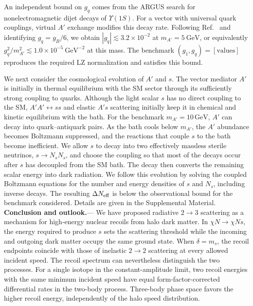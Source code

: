 \documentclass[prd,showpacs,preprintnumbers,amsmath,amssymb,twocolumn,
superscriptaddress,notitlepage]{revtex4-2}
\begin{document}
An independent bound on $g_q$ comes from the ARGUS search
for nonelectromagnetic dijet decays of $\Upsilon(1S)$.
For a vector with universal quark couplings, virtual $A'$
exchange modifies this decay rate. Following
Ref.~\cite{Dobrescu:2021vak} and identifying $g_q=g_B/6$,
we obtain $|g_q|\lesssim 3.2\times10^{-2}$ at
$m_{A'}=5~\mathrm{GeV}$, or equivalently
$g_q^2/m_{A'}^2\lesssim 1.0\times10^{-5}~\mathrm{GeV}^{-2}$
at this mass. The benchmark $(g_1,g_q)=[\text{values}]$
reproduces the required LZ normalization and satisfies
this bound. 

We next consider the cosmological evolution of $A'$ and $s$.
The vector mediator $A'$ is initially in thermal equilibrium with the
SM sector through its sufficiently strong coupling to quarks.
Although the light scalar $s$ has no direct coupling to the SM,
$A'A'\leftrightarrow ss$ and elastic $A's$ scattering initially keep it
in chemical and kinetic equilibrium with the bath. For the benchmark
$m_{A'}=10\,\mathrm{GeV}$, $A'$ can decay into quark--antiquark pairs.
As the bath cools below $m_{A'}$, the $A'$ abundance becomes Boltzmann
suppressed, and the reactions that couple $s$ to the bath become
inefficient. We allow $s$ to decay into two effectively massless sterile
neutrinos, $s\to N_sN_s$, and choose the coupling so that most of the
decays occur after $s$ has decoupled from the SM bath. The decay then
converts the remaining scalar energy into dark radiation. We follow
this evolution by solving the coupled Boltzmann equations for the number
and energy densities of $s$ and $N_s$, including inverse decays.
The resulting $\Delta N_{\rm eff}$ is below the observational bound for
the benchmark considered. Details are given in the Supplemental Material.
\\


\noindent\textbf{Conclusion and outlook.}---
We have proposed radiative $2\to3$ scattering as a mechanism for
high-energy nuclear recoils from halo dark matter. In
$\chi N\to\chi N s$, the energy required to produce $s$ sets the
scattering threshold while the incoming and outgoing dark matter
occupy the same ground state. When $\delta=m_s$, the recoil
endpoints coincide with those of inelastic $2\to2$ scattering at
every allowed incident speed. The recoil spectrum can nevertheless
distinguish the two processes. For a single isotope in the
constant-amplitude limit, two recoil energies with the same minimum
incident speed have equal form-factor-corrected differential rates
in the two-body process. Three-body phase space favors the higher
recoil energy, independently of the halo speed distribution.
\end{document}
